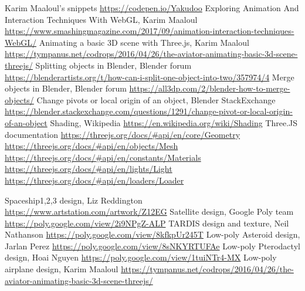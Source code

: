 \documentclass[a4paper,11pt]{article}
\begin{document}
\begin{thebibliography}{}
\bibitem{} Karim Maaloul's snippets \newline
\url{https://codepen.io/Yakudoo}
\bibitem{} Exploring Animation And Interaction Techniques With WebGL, Karim Maaloul \newline
\url{https://www.smashingmagazine.com/2017/09/animation-interaction-techniques-WebGL/}
\bibitem{} Animating a basic 3D scene with Three.js, Karim Maaloul  \newline
\url{https://tympanus.net/codrops/2016/04/26/the-aviator-animating-basic-3d-scene-threejs/}
\bibitem{} Splitting objects in Blender, Blender forum \newline
\url{https://blenderartists.org/t/how-can-i-split-one-object-into-two/357974/4}
\bibitem{} Merge objects in Blender, Blender forum \newline
\url{https://all3dp.com/2/blender-how-to-merge-objects/}
\bibitem{} Change pivots or local origin of an object, Blender StackExchange \newline
\url{https://blender.stackexchange.com/questions/1291/change-pivot-or-local-origin-of-an-object}
\bibitem{} Shading, Wikipedia  \newline
\url{https://en.wikipedia.org/wiki/Shading} \newline
\bibitem{} Three.JS documentation  \newline
\url{https://threejs.org/docs/#api/en/core/Geometry} \newline
\url{https://threejs.org/docs/#api/en/objects/Mesh} \newline
\url{https://threejs.org/docs/#api/en/constants/Materials} \newline
\url{https://threejs.org/docs/#api/en/lights/Light} \newline
\url{https://threejs.org/docs/#api/en/loaders/Loader} \newline

\bibitem{} Spaceship1,2,3 design, Liz Reddington \newline
\url{https://www.artstation.com/artwork/Z12EG}
\bibitem{} Satellite design, Google Poly team  \newline
\url{https://poly.google.com/view/2i9NPgZ-ALP}
\bibitem{} TARDIS design and texture, Neil Nathanson  \newline
\url{https://poly.google.com/view/8kfkpUr245T}
\bibitem{} Low-poly Asteroid design, Jarlan Perez  \newline
\url{https://poly.google.com/view/8sNKYRTUFAe}
\bibitem{} Low-poly Pterodactyl design, Hoai Nguyen \newline
\url{https://poly.google.com/view/1tuiNTr4-MX}
\bibitem{} Low-poly airplane design, Karim Maaloul \newline
\url{https://tympanus.net/codrops/2016/04/26/the-aviator-animating-basic-3d-scene-threejs/}

\end{thebibliography}
\end{document}
